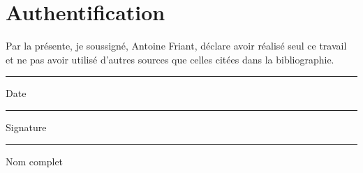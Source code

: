 \documentclass[a4paper, 11pt]{report}
\begin{document}
\printbibliography

\chapter{Authentification}
Par la présente, je soussigné, Antoine Friant, déclare avoir réalisé seul ce travail et ne pas avoir utilisé d'autres sources que celles citées dans la bibliographie.


\vspace*{5cm}


\begin{multicols}{2}
	
	\noindent\rule[0.5ex]{\linewidth}{1pt}
	Date
	
	\columnbreak
	
	\noindent\rule[0.5ex]{\linewidth}{1pt}
	Signature
	
	\vspace*{2cm}
	
	\noindent\rule[0.5ex]{\linewidth}{1pt}
	Nom complet
\end{multicols}


\listoffigures

\end{document}
